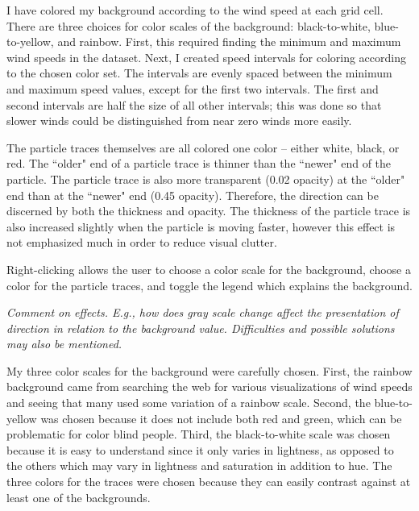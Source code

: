 \documentclass{article} %
\begin{document}
I have colored my background according to the wind speed at each grid cell.  There are three choices for color scales of the background: black-to-white, blue-to-yellow, and rainbow.  First, this required finding the minimum and maximum wind speeds in the dataset.  Next, I created speed intervals for coloring according to the chosen color set. The intervals are evenly spaced between the minimum and maximum speed values, except for the first two intervals.  The first and second intervals are half the size of all other intervals; this was done so that slower winds could be distinguished from near zero winds more easily.  

The particle traces themselves are all colored one color -- either white, black, or red.  The ``older" end of a particle trace is thinner than the ``newer" end of the particle.  The particle trace is also more transparent (0.02 opacity) at the ``older" end than at the ``newer" end (0.45 opacity).  Therefore, the direction can be discerned by both the thickness and opacity.  The thickness of the particle trace is also increased slightly when the particle is moving faster, however this effect is not emphasized much in order to reduce visual clutter.

Right-clicking allows the user to choose a color scale for the background, choose a color for the particle traces, and toggle the legend which explains the background.

\textit{Comment on effects. E.g., how does gray scale change affect the presentation of direction in relation to the background value. Difficulties and possible solutions may also be mentioned.}

My three color scales for the background were carefully chosen.  First, the rainbow background came from searching the web for various visualizations of wind speeds and seeing that many used some variation of a rainbow scale.  Second, the blue-to-yellow was chosen because it does not include both red and green, which can be problematic for color blind people.  Third, the black-to-white scale was chosen because it is easy to understand since it only varies in lightness, as opposed to the others which may vary in lightness and saturation in addition to hue.  The three colors for the traces were chosen because they can easily contrast against at least one of the backgrounds.
\end{document}
